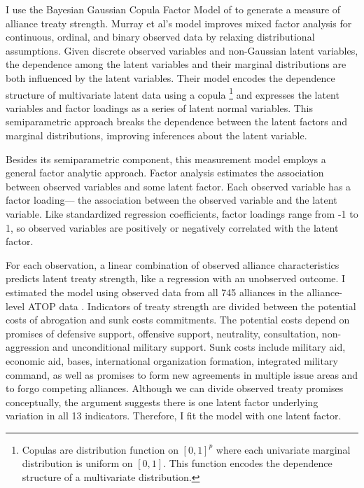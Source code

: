 \documentclass[12pt]{article}
\begin{document}
I use the Bayesian Gaussian Copula Factor Model of \citet{Murrayetal2013} to generate a measure of alliance treaty strength. 
Murray et al's model improves mixed factor analysis for continuous, ordinal, and binary observed data by relaxing distributional assumptions. 
Given discrete observed variables and non-Gaussian latent variables, the dependence among the latent variables and their marginal distributions are both influenced by the latent variables.
Their model encodes the dependence structure of multivariate latent data using a copula
\footnote{Copulas are distribution function on $[0, 1]^p$ where each univariate marginal distribution is uniform on $[0,1]$. This function encodes the dependence structure of a multivariate distribution.} 
and expresses the latent variables and factor loadings as a series of latent normal variables. 
This semiparametric approach breaks the dependence between the latent factors and marginal distributions, improving inferences about the latent variable. 


Besides its semiparametric component, this measurement model employs a general factor analytic approach.
Factor analysis estimates the association between observed variables and some latent factor.
Each observed variable has a factor loading--- the association between the observed variable and the latent variable.  
Like standardized regression coefficients, factor loadings range from -1 to 1, so observed variables are positively or negatively correlated with the latent factor.  


For each observation, a linear combination of observed alliance characteristics predicts latent treaty strength, like a regression with an unobserved outcome.  
I estimated the model using observed data from all 745 alliances in the alliance-level ATOP data \citep{Leedsetal2002}. 
Indicators of treaty strength are divided between the potential costs of abrogation and sunk costs commitments.
The potential costs depend on promises of defensive support, offensive support, neutrality, consultation, non-aggression and unconditional military support. 
Sunk costs include military aid, economic aid, bases, international organization formation, integrated military command, as well as promises to form new agreements in multiple issue areas and to forgo competing alliances. 
Although we can divide observed treaty promises conceptually, the argument suggests there is one latent factor underlying variation in all 13 indicators.
Therefore, I fit the model with one latent factor. 
\end{document}
